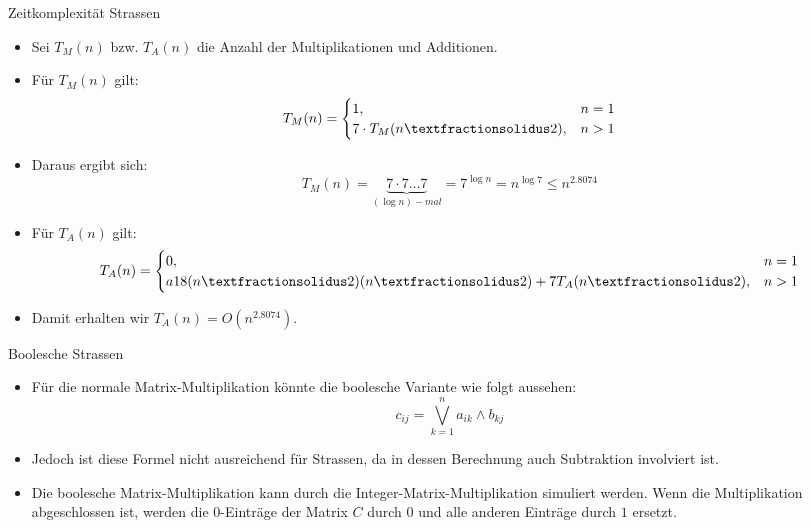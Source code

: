 \documentclass{beamer}
\begin{document}
	\begin{frame}{Zeitkomplexität Strassen}
		\begin{itemize}
			\item Sei $T_M(n)$ bzw. $T_A(n)$ die Anzahl der Multiplikationen und Additionen.
			\pause
			\item Für $T_M(n)$ gilt:
			$$
			T_M(n) = 
			\begin{cases}
				1, & n=1\\
				7 \cdot T_M(n \textfractionsolidus 2), & n>1 
			\end{cases}
			$$
			\pause
			\item Daraus ergibt sich:
			$$T_M(n) = \underbrace{7 \cdot 7 \ldots 7}_{(\log n)-mal} = 7^{\log n} = n^{\log 7} \le n^{2.8074}$$
			\pause
			\item Für $T_A(n)$ gilt:
				$$
			T_A(n) = 
			\begin{cases}
				0, & n=1\\a
				18(n\textfractionsolidus 2) (n\textfractionsolidus 2) + 7T_A(n\textfractionsolidus 2), & n>1 
			\end{cases}
			$$
			\pause
			\item Damit erhalten wir $T_A(n) = O(n^{2.8074})$.
		\end{itemize}
	\end{frame}

	\begin{frame}{Boolesche Strassen}
		\begin{itemize}
			\item Für die normale Matrix-Multiplikation könnte die boolesche Variante wie folgt aussehen:
			\[
			c_{ij} = \bigvee_{k=1}^n a_{ik} \land b_{kj}
			\]
			\pause
			\item Jedoch ist diese Formel nicht ausreichend für Strassen, da in dessen Berechnung auch Subtraktion involviert ist.
			\pause
			\item Die boolesche Matrix-Multiplikation kann durch die Integer-Matrix-Multiplikation simuliert werden. Wenn die Multiplikation abgeschlossen ist, werden die $0$-Einträge der Matrix $C$ durch $0$ und alle anderen Einträge durch $1$ ersetzt.
		\end{itemize}
	\end{frame}
	
\end{document}
